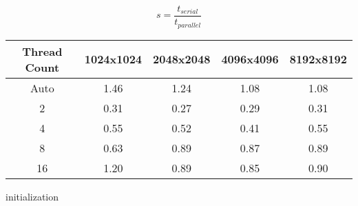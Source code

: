 \documentclass[12pt]{article}
\begin{document}
\begin{equation}
    s = \frac{t_{serial}}{t_{parallel}}
\end{equation}

\pagebreak
\begin{center}
\hspace*{-2.5cm}
\begin{tabular}{@{}|c|c|c|c|c|}
\hline
Thread Count & 1024x1024 & 2048x2048 & 4096x4096 & 8192x8192 \\

\hline
Auto & 1.46 & 1.24 & 1.08 & 1.08 \\
\hline
2 & 0.31 & 0.27 & 0.29 & 0.31 \\
\hline
4 & 0.55 & 0.52 & 0.41 & 0.55 \\
\hline
8 & 0.63 & 0.89 & 0.87 & 0.89 \\
\hline 
16 & 1.20 & 0.89 & 0.85 & 0.90 \\
\hline
\end{tabular}
\hspace*{-2.5cm}
\end{center}

\vspace{1cm}
\begin{algorithm}[H]
\SetAlgoLined
{}
initialization\;

\end{algorithm}

\end{document}
